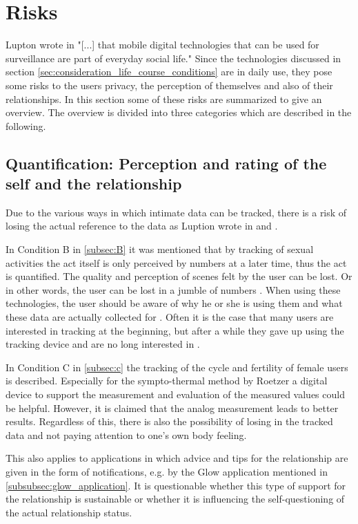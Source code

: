 \section{Risks}
\label{sec:risks}
Lupton wrote in \cite{doi:10.1080/13691058.2014.920528} "[...] that mobile digital technologies that can be used for surveillance are part of everyday social life."
Since the technologies discussed in section \ref{sec:consideration_life_course_conditions} are in daily use, they pose some risks to the users privacy, the perception of themselves and also of their relationships.
In this section some of these risks are summarized to give an overview.
The overview is divided into three categories which are described in the following.

\subsection{Quantification: Perception and rating of the self and the relationship}
Due to the various ways in which intimate data can be tracked, there is a risk of losing the actual reference to the data as Luption wrote in  \cite{doi:10.1080/13691058.2014.920528} and \cite{lupton2016quantified}.

In Condition B in \ref{subsec:B} it was mentioned that by tracking of sexual activities the act itself is only perceived by numbers at a later time, thus the act is quantified. The quality and perception of scenes felt by the user can be lost. Or in other words, the user can be lost in a jumble of numbers \cite{kelly2017inevitable}.
When using these technologies, the user should be aware of why he or she is using them and what these data are actually collected for \cite{doi:10.1080/15265161.2017.1409823}. 
Often it is the case that many users are interested in tracking at the beginning, but after a while they gave up using the tracking device and are no long interested in \cite{sjoklint2015complexities}.

In Condition C in \ref{subsec:c} the tracking of the cycle and fertility of female users is described. 
Especially for the sympto-thermal method by Roetzer a digital device to support the measurement and evaluation of the measured values could be helpful. However, it is claimed that the 
analog measurement leads to better results. %
Regardless of this, there is also the possibility of losing in the tracked data and not paying attention to one's own body feeling.

This also applies to applications in which advice and tips for the relationship are given in the form of notifications, e.g. by the Glow application mentioned in \ref{subsubsec:glow_application}. It is questionable whether this type of support for the relationship is sustainable or whether it is influencing the self-questioning of the actual relationship status.

